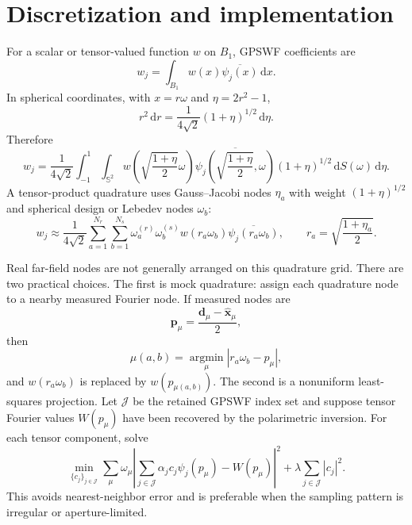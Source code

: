 \documentclass[11pt]{article}
\numberwithin{equation}{section}
\newcommand{\Sph}{\mathbb{S}}
\newcommand{\dd}{\,\mathrm d}
\newcommand{\vect}[1]{\bm{#1}}
\newcommand{\abs}[1]{\left\lvert #1\right\rvert}
\theoremstyle{plain}
\theoremstyle{definition}
\begin{document}
\section{Discretization and implementation}\label{sec:discretization}

For a scalar or tensor-valued function $w$ on $B_1$, GPSWF coefficients are
\begin{equation*}
  w_j=\int_{B_1}w(x)\overline{\psi_j(x)}\dd x.
\end{equation*}
In spherical coordinates, with $x=r\omega$ and $\eta=2r^2-1$,
\begin{equation*}
  r^2\dd r=\frac{1}{4\sqrt2}(1+\eta)^{1/2}\dd\eta.
\end{equation*}
Therefore
\begin{equation*}
  w_j=\frac{1}{4\sqrt2}\int_{-1}^1\int_{\Sph^2}
  w\left(\sqrt{\frac{1+\eta}{2}}\omega\right)
  \overline{\psi_j\left(\sqrt{\frac{1+\eta}{2}},\omega\right)}
  (1+\eta)^{1/2}\dd S(\omega)\dd\eta .
\end{equation*}
A tensor-product quadrature uses Gauss--Jacobi nodes $\eta_a$ with weight $(1+\eta)^{1/2}$ and spherical design or Lebedev nodes $\omega_b$:
\begin{equation}\label{eq:projection_discrete}
  w_j\approx\frac{1}{4\sqrt2}\sum_{a=1}^{N_r}\sum_{b=1}^{N_s}
  \omega_a^{(r)}\omega_b^{(s)}w(r_a\omega_b)\overline{\psi_j(r_a\omega_b)},
  \qquad
  r_a=\sqrt{\frac{1+\eta_a}{2}}.
\end{equation}

Real far-field nodes are not generally arranged on this quadrature grid.  There are two practical choices.  The first is mock quadrature: assign each quadrature node to a nearby measured Fourier node.  If measured nodes are
\begin{equation*}
  \vect{p}_{\mu}=\frac{\vect{d}_{\mu}-\hat{\vect{x}}_{\mu}}{2},
\end{equation*}
then
\begin{equation*}
  \mu(a,b)=\operatorname*{argmin}_{\mu}\abs{r_a\omega_b-p_\mu},
\end{equation*}
and $w(r_a\omega_b)$ is replaced by $w(p_{\mu(a,b)})$.  The second is a nonuniform least-squares projection.  Let $\mathcal J$ be the retained GPSWF index set and suppose tensor Fourier values $W(p_\mu)$ have been recovered by the polarimetric inversion.  For each tensor component, solve
\begin{equation}\label{eq:nonuniform_LS}
  \min_{\{c_j\}_{j\in\mathcal J}}
  \sum_{\mu} \omega_\mu\left|\sum_{j\in\mathcal J}\alpha_jc_j\psi_j(p_\mu)-W(p_\mu)\right|^2
  +\lambda\sum_{j\in\mathcal J}\abs{c_j}^2 .
\end{equation}
This avoids nearest-neighbor error and is preferable when the sampling pattern is irregular or aperture-limited.
\end{document}
